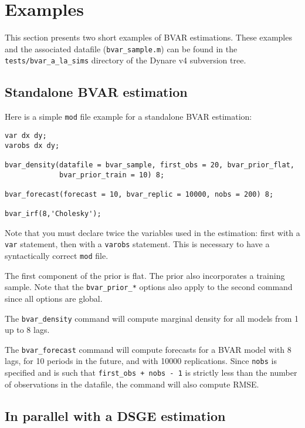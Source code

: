 \documentclass[11pt,a4paper]{article}
\begin{document}
\section{Examples}

This section presents two short examples of BVAR estimations. These examples and the associated datafile (\texttt{bvar\_sample.m}) can be found in the \texttt{tests/bvar\_a\_la\_sims} directory of the Dynare v4 subversion tree.

\subsection{Standalone BVAR estimation}

Here is a simple \texttt{mod} file example for a standalone BVAR estimation:

\begin{verbatim}
var dx dy;
varobs dx dy;

bvar_density(datafile = bvar_sample, first_obs = 20, bvar_prior_flat,
             bvar_prior_train = 10) 8;

bvar_forecast(forecast = 10, bvar_replic = 10000, nobs = 200) 8;

bvar_irf(8,'Cholesky');
\end{verbatim}

Note that you must declare twice the variables used in the estimation: first with a \texttt{var} statement, then with a \texttt{varobs} statement. This is necessary to have a syntactically correct \texttt{mod} file.

The first component of the prior is flat. The prior also incorporates a training sample. Note that the \texttt{bvar\_prior\_*} options also apply to the second command since all options are global.

The \texttt{bvar\_density} command will compute marginal density for all models from 1 up to 8 lags.

The \texttt{bvar\_forecast} command will compute forecasts for a BVAR model with 8 lags, for 10 periods in the future, and with 10000 replications. Since \texttt{nobs} is specified and is such that \texttt{first\_obs + nobs - 1} is strictly less than the number of observations in the datafile, the command will also compute RMSE.

\subsection{In parallel with a DSGE estimation}
\end{document}
